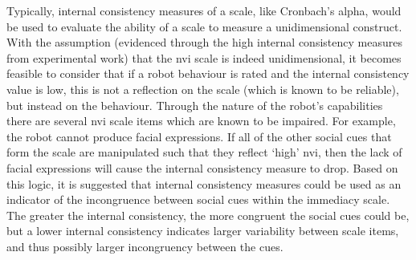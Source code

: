 Typically, internal consistency measures of a scale, like Cronbach's alpha, would be used to evaluate the ability of a scale to measure a unidimensional construct. With the assumption (evidenced through the high internal consistency measures from experimental work) that the \acrshort{nvi} scale is indeed unidimensional, it becomes feasible to consider that if a robot behaviour is rated and the internal consistency value is low, this is not a reflection on the scale (which is known to be reliable), but instead on the behaviour. Through the nature of the robot's capabilities there are several \acrshort{nvi} scale items which are known to be impaired. For example, the robot cannot produce facial expressions. If all of the other social cues that form the scale are manipulated such that they reflect `high' \acrshort{nvi}, then the lack of facial expressions will cause the internal consistency measure to drop. Based on this logic, it is suggested that internal consistency measures could be used as an indicator of the incongruence between social cues within the immediacy scale. The greater the internal consistency, the more congruent the social cues could be, but a lower internal consistency indicates larger variability between scale items, and thus possibly larger incongruency between the cues.

